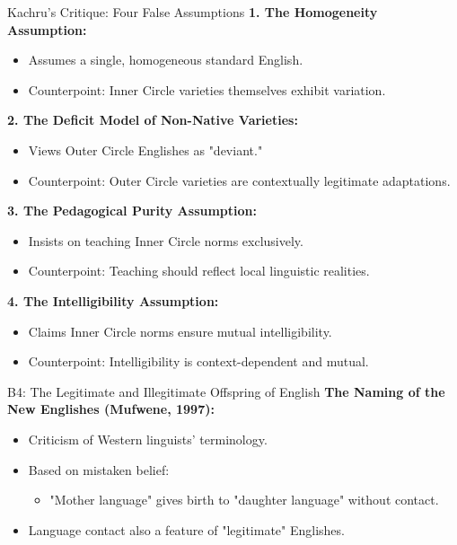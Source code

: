 \documentclass{beamer}
\begin{document}
\begin{frame}{Kachru's Critique: Four False Assumptions}
\textbf{1. The Homogeneity Assumption:}
\begin{itemize}
    \item Assumes a single, homogeneous standard English.
    \item Counterpoint: Inner Circle varieties themselves exhibit variation.
\end{itemize}

\textbf{2. The Deficit Model of Non-Native Varieties:}
\begin{itemize}
    \item Views Outer Circle Englishes as "deviant."
    \item Counterpoint: Outer Circle varieties are contextually legitimate adaptations.
\end{itemize}

\textbf{3. The Pedagogical Purity Assumption:}
\begin{itemize}
    \item Insists on teaching Inner Circle norms exclusively.
    \item Counterpoint: Teaching should reflect local linguistic realities.
\end{itemize}

\textbf{4. The Intelligibility Assumption:}
\begin{itemize}
    \item Claims Inner Circle norms ensure mutual intelligibility.
    \item Counterpoint: Intelligibility is context-dependent and mutual.
\end{itemize}
\end{frame}


\begin{frame}{B4: The Legitimate and Illegitimate Offspring of English}
\textbf{The Naming of the New Englishes (Mufwene, 1997):}
\begin{itemize}
    \item Criticism of Western linguists’ terminology.
    \item Based on mistaken belief:
    \begin{itemize}
        \item "Mother language" gives birth to "daughter language" without contact.
    \end{itemize}
    \item Language contact also a feature of "legitimate" Englishes.
\end{itemize}
\end{frame}
\end{document}
